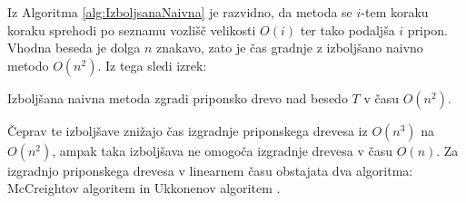 
Iz Algoritma \ref{alg:IzboljsanaNaivna} je razvidno, da metoda se $i$-tem koraku koraku sprehodi po seznamu vozlišč velikosti $O(i)$ ter tako podaljša $i$ pripon. Vhodna beseda je dolga $n$ znakavo, zato je čas gradnje z izboljšano naivno metodo $O(n^2)$. Iz tega sledi izrek:

\begin{izr}\label{izr:naivnaIzbolsana}
    Izboljšana naivna metoda zgradi priponsko drevo nad besedo $T$ v času $O(n^2)$.
\end{izr}

%
\newpage

Čeprav te izboljšave znižajo čas izgradnje priponskega drevesa iz $O(n^3)$ na $O(n^2)$, ampak taka izboljšava ne omogoča izgradnje drevesa v času $O(n)$. Za izgradnjo priponskega drevesa v linearnem času obstajata dva algoritma: McCreightov algoritem \cite{McCreight1976} in Ukkonenov algoritem \cite{Ukkonen1995}. 

